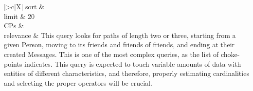 \begin{tabularx}{\queryCardWidth}{|>{\queryPropertyCell}c|X|}
%
	sort        &
        \innerCardVSpace \\ \hline
	limit & 20 \\ \hline
	CPs &
	 \\ \hline
    relevance &
        \small This query looks for paths of length two or three, starting from a given Person, moving to its friends and friends of
friends, and ending at their created Messages. This is one of the most complex queries, as the list of choke-points
indicates. This query is expected to touch variable amounts of data with entities of different characteristics, and
therefore, properly estimating cardinalities and selecting the proper operators will be crucial.
 \\ \hline%
\end{tabularx}
\queryCardVSpace
